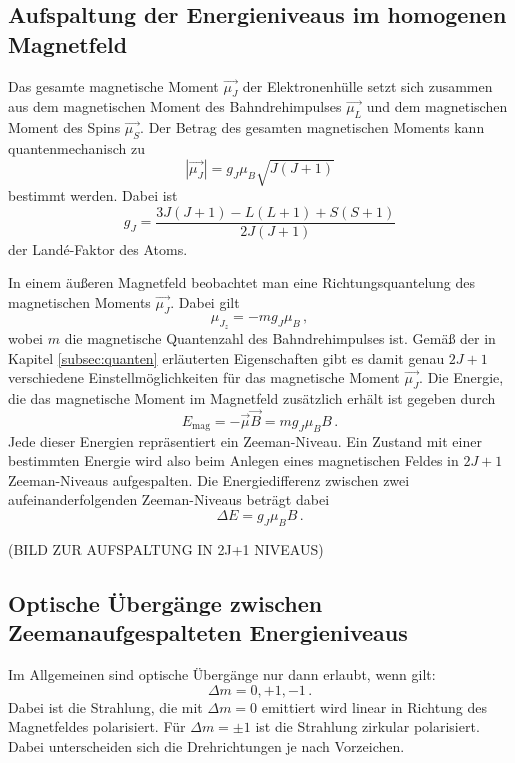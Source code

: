 \subsection{Aufspaltung der Energieniveaus im homogenen Magnetfeld}

Das gesamte magnetische Moment $\vec{\mu_J}$ der Elektronenhülle setzt sich
zusammen aus dem magnetischen Moment des Bahndrehimpulses $\vec{\mu_L}$ und
dem magnetischen Moment des Spins $\vec{\mu_S}$. Der Betrag des gesamten
magnetischen Moments kann quantenmechanisch zu
\begin{equation}
  |\vec{\mu_J}| = g_J \mu_B \sqrt{J(J+1)}
\end{equation}
bestimmt werden. Dabei ist
\begin{equation}
  g_J = \frac{3J(J+1)-L(L+1)+S(S+1)}{2J(J+1)}
  \label{eqn:lande}
\end{equation}
der Landé-Faktor des Atoms.

In einem äußeren Magnetfeld beobachtet man eine Richtungsquantelung des magnetischen
Moments $\vec{\mu_J}$. Dabei gilt
\begin{equation}
  \mu_{J_z} = -m g_J \mu_B \,,
\end{equation}
wobei $m$ die magnetische Quantenzahl des Bahndrehimpulses ist. Gemäß der in Kapitel
\ref{subsec:quanten} erläuterten Eigenschaften gibt es damit genau $2J+1$ verschiedene
Einstellmöglichkeiten für das magnetische Moment $\vec{\mu_J}$.
Die Energie, die das magnetische Moment im Magnetfeld zusätzlich erhält ist
gegeben durch
\begin{equation}
    E_\text{mag} =-\vec{\mu} \vec{B} = m g_J \mu_B B\,.
\end{equation}
Jede dieser Energien repräsentiert ein Zeeman-Niveau. Ein Zustand mit einer
bestimmten Energie wird also beim Anlegen eines magnetischen Feldes in $2J+1$
Zeeman-Niveaus aufgespalten.
Die Energiedifferenz zwischen zwei aufeinanderfolgenden Zeeman-Niveaus beträgt dabei
\begin{equation}
  \Delta E=g_J \mu_B B\,.
\end{equation}

(BILD ZUR AUFSPALTUNG IN 2J+1 NIVEAUS)


\subsection{Optische Übergänge zwischen Zeemanaufgespalteten Energieniveaus}

Im Allgemeinen sind optische Übergänge nur dann erlaubt, wenn gilt:
\begin{equation}
  \Delta m= 0, +1 , -1 \,.
\end{equation}
Dabei ist die Strahlung, die mit $\Delta m= 0$ emittiert wird linear in Richtung des
Magnetfeldes polarisiert. Für $\Delta m= \pm1$ ist die Strahlung zirkular polarisiert.
Dabei unterscheiden sich die Drehrichtungen je nach Vorzeichen.

